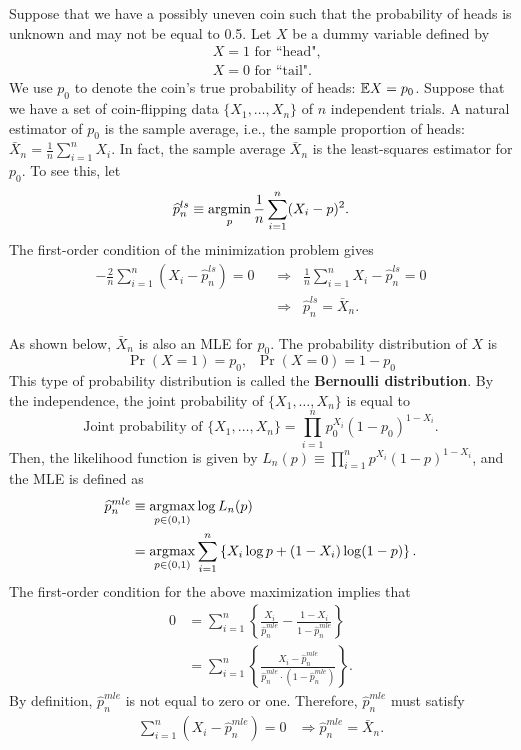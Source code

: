 \documentclass[11pt, A4paper, openany, uplatex]{book}
\begin{document}
\begin{example}\label{ex:coin}\upshape
Suppose that we have a possibly uneven coin such that the probability of heads is unknown and may not be equal to 0.5. 
Let $X$ be a dummy variable defined by
\begin{align*}
&X = 1 \text{ for ``head",}\\
&X = 0 \text{ for ``tail".}
\end{align*}
We use $p_0$ to denote the coin's true probability of heads: $\mathbb{E} X = p_0$. 
Suppose that we have a set of coin-flipping data $\{X_1, \ldots , X_n \}$ of $n$ independent trials.
A natural estimator of $p_0$ is the sample average, i.e., the sample proportion of heads: $\bar{X}_n = \frac{1}{n}\sum_{i = 1}^n X_i$.
In fact, the sample average $\bar{X}_n$ is the least-squares estimator for $p_0$.
To see this, let
\[
	\widehat p_n^{ls} \equiv \operatorname*{\arg\!\min}_{p} \frac{1}{n}\sum_{i=1}^n (X_i - p)^2.
\]
The first-order condition of the minimization problem gives
\begin{align*}
	- \frac{2}{n} \sum_{i = 1}^n (X_i - \hat p_n^{ls}) = 0 \;\; 
	& \Rightarrow \;\; \frac{1}{n}\sum_{i = 1}^n X_i  -  \hat p_n^{ls} = 0 \\
	& \Rightarrow \;\; \hat p_n^{ls} = \bar{X}_n.
\end{align*}

As shown below, $\bar{X}_n$ is also an MLE for $p_0$.
The probability distribution of $X$ is
\[
	\Pr(X = 1) = p_0, \;\; \Pr(X = 0) = 1- p_0
\]
This type of probability distribution is called the \textbf{Bernoulli distribution}.
By the independence, the joint probability of $\{X_1, \ldots , X_n\}$ is equal to
\[
	\text{Joint probability of $\{X_1, \ldots, X_n\}$} = \prod_{i = 1}^n  p_0^{X_i} (1 - p_0)^{1-X_i}.
\]
Then, the likelihood function is given by $L_n(p) \equiv \prod_{i = 1}^n  p^{X_i} (1 - p)^{1-X_i}$, and the MLE is defined as
\begin{align*}
	\widehat{p}^{mle}_n 
	& \equiv \operatorname*{\arg\!\max}_{p \in (0,1)} \log L_n(p) \\
	& = \operatorname*{\arg\!\max}_{p \in (0,1)} \sum_{i =1}^n\left\{ X_i\log p + (1 - X_i)\log( 1-p)\right\}.
\end{align*}
The first-order condition for the above maximization implies that 
\begin{align*}
	0
	& = \sum_{i=1}^n\left\{ \frac{X_i}{\hat{p}^{mle}_n} - \frac{1 - X_i}{1 - \hat{p}^{mle}_n} \right\}\\
	& = \sum_{i=1}^n\left\{ \frac{X_i - \hat{p}^{mle}_n}{\hat{p}^{mle}_n \cdot (1 - \hat{p}^{mle}_n)} \right\}.
\end{align*}
By definition, $\hat{p}^{mle}_n$ is not equal to zero or one.
Therefore, $\hat{p}_n^{mle}$ must satisfy
\begin{align*}
\sum_{i=1}^n (X_i - \hat{p}_n^{mle}) = 0
& \Rightarrow \hat{p}_n^{mle} = \bar{X}_n.
\end{align*}
\end{example}
\bigskip
\end{document}
